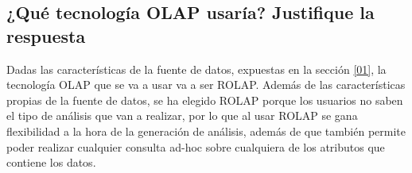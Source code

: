 \medskip
\subsection{¿Qué tecnología OLAP usaría? Justifique la respuesta}
Dadas las características de la fuente de datos, expuestas en la sección \ref{01}, la tecnología OLAP que se va a usar va a ser ROLAP. Además de las características propias de la fuente de datos, se ha elegido ROLAP porque los usuarios no saben el tipo de análisis que van a realizar, por lo que al usar ROLAP se gana flexibilidad a la hora de la generación de análisis, además de que también permite poder realizar cualquier consulta ad-hoc sobre cualquiera de los atributos que contiene los datos.
